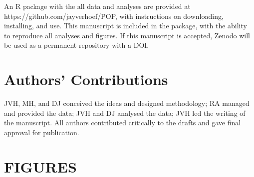 \documentclass[11pt, titlepage]{article}
\begin{document}
\begin{spacing}{1.9}
\begin{flushleft}
An R package with the all data and analyses are provided at https://github.com/jayverhoef/POP, with instructions on downloading, installing, and use.  This manuscript is included in the package, with the ability to reproduce all analyses and figures. If this manuscript is accepted, Zenodo will be used as a permanent repository with a DOI.

\section*{Authors' Contributions}

JVH, MH, and DJ conceived the ideas and designed methodology; RA managed and provided the data; JVH and DJ analysed the data; JVH led the writing of the manuscript. All authors contributed critically to the drafts and gave final approval for publication.


%


%
%


\newpage
{}

\section*{FIGURES}



\end{flushleft}
\end{spacing}
\end{document}
